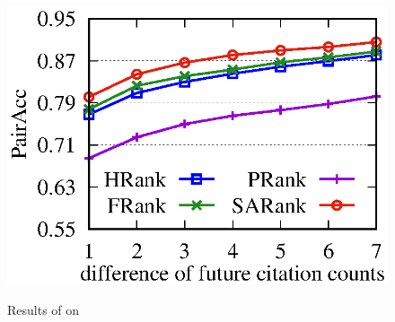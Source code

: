 {\begin{figure}[tb!]
\begin{center}
{\includegraphics[scale=0.415]{./exp/AAN_PairAcc3.eps}}
\hspace{-3ex}
\end{center}
\vspace{-5ex}
\caption{Results of \PairAcc on \aan}
\label{fig-future-period}
\vspace{-2ex}
\end{figure}
\begin{figure}[tb!]
\begin{center}
\end{center}
\end{figure}}

